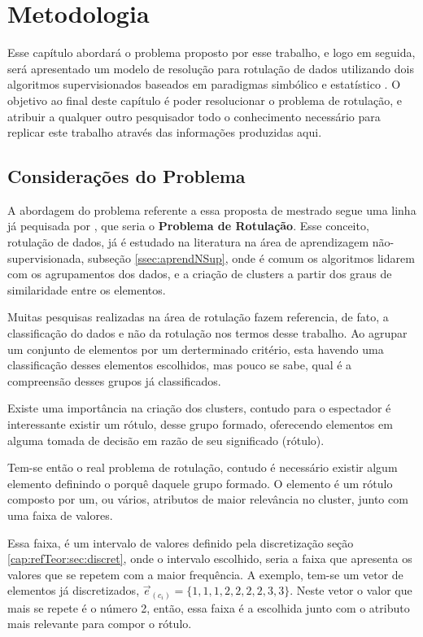 \chapter{Metodologia} \label{cap:ferramentas}

Esse capítulo abordará o problema proposto por esse trabalho, e logo em seguida, será apresentado um modelo de resolução para rotulação de dados utilizando dois algoritmos supervisionados baseados em paradigmas simbólico e estatístico . O objetivo ao final deste capítulo é poder resolucionar o problema de rotulação, e atribuir a qualquer outro pesquisador todo o conhecimento necessário para replicar este trabalho através das informações produzidas aqui.

\section{Considerações do Problema}\label{cap:ferramentas:sec:considproblema}

A abordagem do problema referente a essa proposta de mestrado segue uma linha já pequisada por , que seria o \textbf{Problema de Rotulação}. Esse conceito, rotulação de dados,  já é estudado na literatura na área de aprendizagem não-supervisionada, subseção \ref{ssec:aprendNSup}, onde é comum os algoritmos lidarem com os agrupamentos dos dados, e a criação de clusters a partir dos graus de  similaridade entre os elementos.

Muitas pesquisas realizadas na área de rotulação fazem referencia, de fato, a classificação do dados e não da rotulação nos termos desse trabalho. Ao agrupar um conjunto de elementos por um derterminado critério, esta havendo uma classificação desses elementos escolhidos, mas pouco se sabe, qual é a compreensão desses grupos já classificados. 

Existe uma importância na criação dos clusters, contudo para o espectador é interessante existir um rótulo, desse grupo formado, oferecendo elementos em alguma tomada de decisão em razão de seu significado (rótulo).

Tem-se então o real problema de rotulação, contudo é necessário existir algum elemento definindo o porquê daquele grupo formado. O elemento é um rótulo composto por um, ou vários, atributos de maior relevância no cluster, junto com uma faixa de valores. 

Essa faixa, é um intervalo de valores definido pela discretização seção \ref{cap:refTeor:sec:discret}, onde o intervalo escolhido, seria a faixa que apresenta os valores que se repetem com a maior frequência. A exemplo, tem-se um vetor de elementos já discretizados, ${\vec{e}_{(c_i)}=\{1,1,1,2,2,2,2,3,3\}}$. Neste vetor o valor que mais se repete é o número 2, então, essa faixa  é a escolhida junto com o atributo mais relevante para compor o rótulo.

